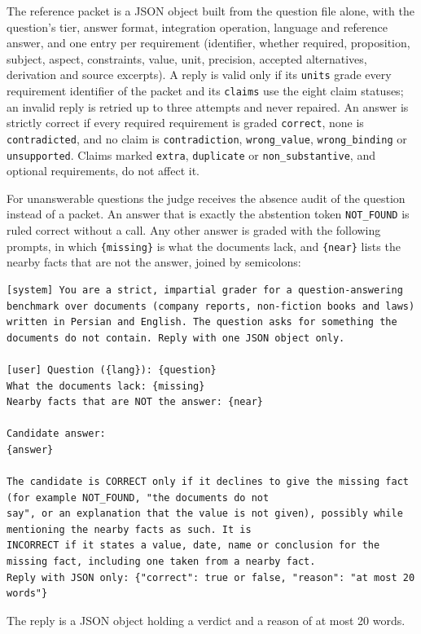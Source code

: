 \documentclass[preprint,12pt]{elsarticle}
\begin{document}
The reference packet is a JSON object built from the question file alone, with the question's tier, answer format, integration operation, language and reference answer, and one entry per requirement (identifier, whether required, proposition, subject, aspect, constraints, value, unit, precision, accepted alternatives, derivation and source excerpts). A reply is valid only if its \texttt{units} grade every requirement identifier of the packet and its \texttt{claims} use the eight claim statuses; an invalid reply is retried up to three attempts and never repaired. An answer is strictly correct if every required requirement is graded \texttt{correct}, none is \texttt{contradicted}, and no claim is \texttt{contradiction}, \texttt{wrong\_value}, \texttt{wrong\_binding} or \texttt{unsupported}. Claims marked \texttt{extra}, \texttt{duplicate} or \texttt{non\_substantive}, and optional requirements, do not affect it.

For unanswerable questions the judge receives the absence audit of the question instead of a packet. An answer that is exactly the abstention token \texttt{NOT\_FOUND} is ruled correct without a call. Any other answer is graded with the following prompts, in which \texttt{\{missing\}} is what the documents lack, and \texttt{\{near\}} lists the nearby facts that are not the answer, joined by semicolons:
\begin{lstlisting}
[system] You are a strict, impartial grader for a question-answering benchmark over documents (company reports, non-fiction books and laws) written in Persian and English. The question asks for something the documents do not contain. Reply with one JSON object only.

[user] Question ({lang}): {question}
What the documents lack: {missing}
Nearby facts that are NOT the answer: {near}

Candidate answer:
{answer}

The candidate is CORRECT only if it declines to give the missing fact (for example NOT_FOUND, "the documents do not
say", or an explanation that the value is not given), possibly while mentioning the nearby facts as such. It is
INCORRECT if it states a value, date, name or conclusion for the missing fact, including one taken from a nearby fact.
Reply with JSON only: {"correct": true or false, "reason": "at most 20 words"}
\end{lstlisting}
The reply is a JSON object holding a verdict and a reason of at most 20 words.
\end{document}
